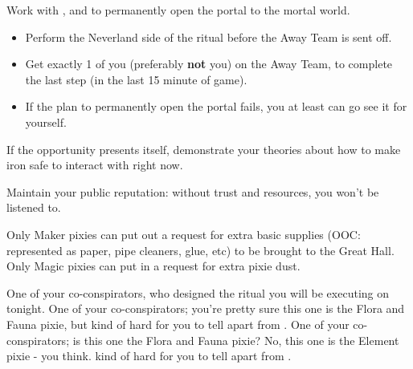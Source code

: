 \documentclass[char]{PP}
\begin{document}
\begin{itemz}
	\item Work with \cSLibrarian{}, \cFHeart{} and \cESweet{} to permanently open the portal to the mortal world.
	\begin{itemize}
		\item Perform the Neverland side of the ritual before the Away Team is sent off.
		\item Get exactly 1 of you (preferably \textbf{not} you) on the Away Team, to complete the last step (in the last 15 minute of game).
		\item If the plan to permanently open the portal fails, you at least can go see it for yourself.
	\end{itemize}
	\item If the opportunity presents itself, demonstrate your theories about how to make iron safe to interact with right now.
	\item Maintain your public reputation: without trust and resources, you won't be listened to.
	\item
\end{itemz}

\begin{itemz}[Notes]
	\item Only Maker pixies can put out a request for extra basic supplies (OOC: represented as paper, pipe cleaners, glue, etc) to be brought to the Great Hall. Only Magic pixies can put in a request for extra pixie dust.
\end{itemz}

\begin{contacts}
	\contact{\cSLibrarian{}} One of your co-conspirators, who designed the ritual you will be executing on tonight.
	\contact{\cFHeart{}} One of your co-conspirators; you’re pretty sure this one is the Flora and Fauna pixie, but \cFHeart{\they} \cFHeart{\are} kind of hard for you to tell apart from \cESweet{}.
	\contact{\cESweet{}} One of your co-conspirators; is this one the Flora and Fauna pixie? No, this one is the Element pixie - you think. \cESweet{\They} \cESweet{\are} kind of hard for you to tell apart from \cFHeart{}.
\end{contacts}
\end{document}
